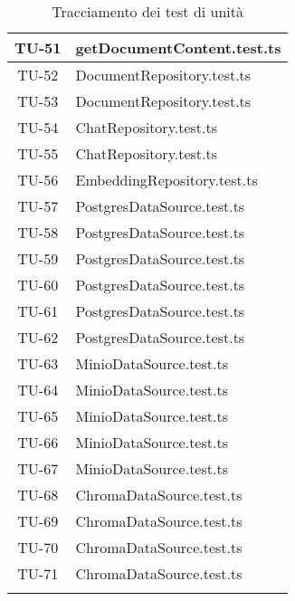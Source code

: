 \begin{xltabular}{0.7\textwidth}{| c | X |}
    \hline
    TU-51 & getDocumentContent.test.ts \\
    \hline
    TU-52 & DocumentRepository.test.ts \\
    \hline
    TU-53 & DocumentRepository.test.ts \\
    \hline
    TU-54 & ChatRepository.test.ts \\
    \hline
    TU-55 & ChatRepository.test.ts \\
    \hline
    TU-56 & EmbeddingRepository.test.ts \\
    \hline
    TU-57 & PostgresDataSource.test.ts \\
    \hline
    TU-58 & PostgresDataSource.test.ts \\
    \hline
    TU-59 & PostgresDataSource.test.ts \\
    \hline
    TU-60 & PostgresDataSource.test.ts \\
    \hline
    TU-61 & PostgresDataSource.test.ts \\
    \hline
    TU-62 & PostgresDataSource.test.ts \\
    \hline
    TU-63 & MinioDataSource.test.ts \\
    \hline
    TU-64 & MinioDataSource.test.ts \\
    \hline
    TU-65 & MinioDataSource.test.ts \\
    \hline
    TU-66 & MinioDataSource.test.ts \\
    \hline
    TU-67 & MinioDataSource.test.ts \\
    \hline
    TU-68 & ChromaDataSource.test.ts \\
    \hline
    TU-69 & ChromaDataSource.test.ts \\
    \hline
    TU-70 & ChromaDataSource.test.ts \\
    \hline
    TU-71 & ChromaDataSource.test.ts \\
    \hline
     \caption{Tracciamento dei test di unità}
    \label{tab:tracctestunita}
\end{xltabular}